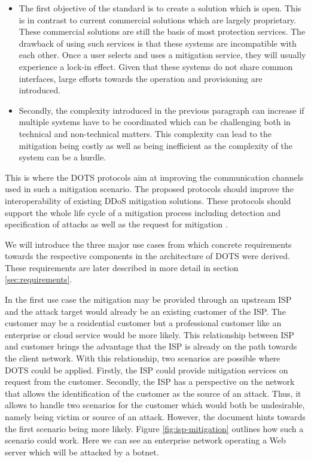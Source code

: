 \begin{itemize}
\item The first objective of the standard is to create a solution which is open. This is in contrast to current commercial solutions which are largely proprietary. These commercial solutions are still the basis of most protection services. The drawback of using such services is that these systems are incompatible with each other. Once a user selects and uses a mitigation service, they will usually experience a lock-in effect. Given that these systems do not share common interfaces, large efforts towards the operation and provisioning are introduced.

\item Secondly, the complexity introduced in the previous paragraph can increase if multiple systems have to be coordinated which can be challenging both in technical and non-technical matters. This complexity can lead to the mitigation being costly as well as being inefficient as the complexity of the system can be a hurdle.
\end{itemize}

This is where the DOTS protocols aim at improving the communication channels used in such a mitigation scenario. The proposed protocols should improve the interoperability of existing DDoS mitigation solutions. These protocols should support the whole life cycle of a mitigation process including detection and specification of attacks as well as the request for mitigation \cite{dots-use-cases}.

We will introduce the three major use cases from which concrete requirements towards the respective components in the architecture of DOTS were derived. These requirements are later described in more detail in section \ref{sec:requirements}.

In the first use case the mitigation may be provided through an upstream ISP and the attack target would already be an existing customer of the ISP. The customer may be a residential customer but a professional customer like an enterprise or cloud service would be more likely. This relationship between ISP and customer brings the advantage that the ISP is already on the path towards the client network. With this relationship, two scenarios are possible where DOTS could be applied. Firstly, the ISP could provide mitigation services on request from the customer. Secondly, the ISP has a perspective on the network that allows the identification of the customer as the source of an attack. Thus, it allows to handle two scenarios for the customer which would both be undesirable, namely being victim or source of an attack. However, the document hints towards the first scenario being more likely. Figure \ref{fig:isp-mitigation} outlines how such a scenario could work. Here we can see an enterprise network operating a Web server which will be attacked by a botnet.

